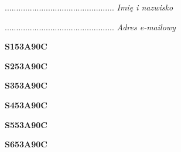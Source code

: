 \begin{turn}{90}\begin{minipage}{\linewidth} \vspace{20mm} ................................................  \textit{Imię i nazwisko}\end{minipage}\end{turn}

\begin{turn}{90}\begin{minipage}{\linewidth} \vspace{20mm} ................................................  \textit{Adres e-mailowy}\end{minipage}\end{turn}

\begin{turn}{90}\huge \begin{minipage}{\linewidth} \vspace{10mm}\textbf{S153A90C}\end{minipage}\end{turn}

\begin{turn}{90}\huge \begin{minipage}{\linewidth} \vspace{10mm}\textbf{S253A90C}\end{minipage}\end{turn}

\begin{turn}{90}\huge \begin{minipage}{\linewidth} \vspace{10mm}\textbf{S353A90C}\end{minipage}\end{turn}

\begin{turn}{90}\huge \begin{minipage}{\linewidth} \vspace{10mm}\textbf{S453A90C}\end{minipage}\end{turn}

\begin{turn}{90}\huge \begin{minipage}{\linewidth} \vspace{10mm}\textbf{S553A90C}\end{minipage}\end{turn}

\begin{turn}{90}\huge \begin{minipage}{\linewidth} \vspace{10mm}\textbf{S653A90C}\end{minipage}\end{turn}

